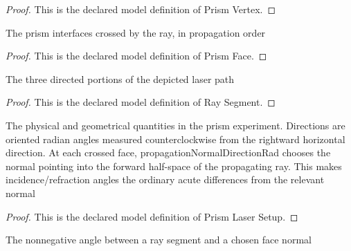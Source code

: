 \begin{proof}
  This is the declared model definition of Prism Vertex.
\end{proof}
\begin{definition}
  \label{def:physics:phyx-mini-0050:phyxminiproblems-problemphyxmini0050-prismface}
  The prism interfaces crossed by the ray, in propagation order
\end{definition}
\begin{proof}
  This is the declared model definition of Prism Face.
\end{proof}
\begin{definition}
  \label{def:physics:phyx-mini-0050:phyxminiproblems-problemphyxmini0050-raysegment}
  The three directed portions of the depicted laser path
\end{definition}
\begin{proof}
  This is the declared model definition of Ray Segment.
\end{proof}
\begin{definition}
  \label{def:physics:phyx-mini-0050:phyxminiproblems-problemphyxmini0050-prismlasersetup}
  The physical and geometrical quantities in the prism experiment. Directions are oriented radian angles measured counterclockwise from the rightward horizontal direction. At each crossed face, propagationNormalDirectionRad chooses the normal pointing into the forward half-space of the propagating ray. This makes incidence/refraction angles the ordinary acute differences from the relevant normal
\end{definition}
\begin{proof}
  This is the declared model definition of Prism Laser Setup.
\end{proof}
\begin{definition}
  \label{def:physics:phyx-mini-0050:phyxminiproblems-problemphyxmini0050-anglefrompropagationnormal}
  The nonnegative angle between a ray segment and a chosen face normal
\end{definition}
